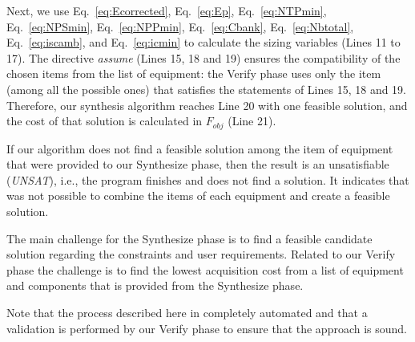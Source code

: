 \documentclass[review]{elsarticle}
\begin{document}
Next, we use Eq.~\eqref{eq:Ecorrected}, Eq.~\eqref{eq:Ep}, Eq.~\eqref{eq:NTPmin}, Eq.~\eqref{eq:NPSmin}, Eq.~\eqref{eq:NPPmin}, Eq.~\eqref{eq:Cbank}, Eq.~\eqref{eq:Nbtotal}, Eq.~\eqref{eq:iscamb}, and Eq.~\eqref{eq:icmin} to calculate the sizing variables (Lines 11 to 17). The directive \textit{assume} (Lines 15, 18 and 19) ensures the compatibility of the chosen items from the list of equipment: the {\sc Verify} phase uses only the item (among all the possible ones) that satisfies the statements of Lines 15, 18 and 19. Therefore, our synthesis algorithm reaches Line 20 with one feasible solution, and the cost of that solution is calculated in $F_{obj}$ (Line 21). 

If our algorithm does not find a feasible solution among the item of equipment that were provided to our {\sc Synthesize} phase,  then the result is an unsatisfiable (\textit{UNSAT}), i.e., the program finishes and does not find a solution. It indicates that was not possible to combine the items of each equipment and create a feasible solution. 

The main challenge for the {\sc Synthesize} phase is to find a feasible candidate solution regarding the constraints and user requirements. Related to our {\sc Verify} phase the challenge is to find the lowest acquisition cost from a list of equipment and components that is provided from the {\sc Synthesize} phase. 

Note that the process described here in completely automated and that a validation is performed by our {\sc Verify} phase to ensure that the approach is sound.
\end{document}
